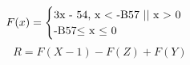 \documentclass{article}
\begin{document}
\begin{equation*}
F(x) =
\begin{cases}
 $3x - 54, x < -B57 || x > 0$\\
 $-B57$\leq$ x $\leq$ 0$
\end{cases}
\end{equation*}
\[R = F(X - 1) - F(Z) + F(Y)\]
\end{document}
